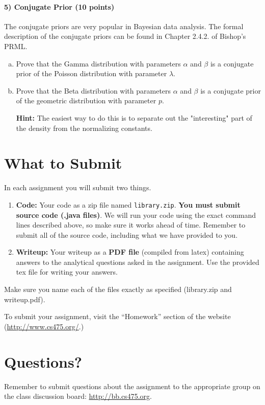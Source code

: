 \documentclass[11pt]{article}
\begin{document}
\paragraph{5) Conjugate Prior (10 points)}
The conjugate priors are very popular in Bayesian data analysis. The formal description of the conjugate priors can be found in Chapter 2.4.2. of Bishop's PRML.
\begin{enumerate}[(a)]
\item Prove that the Gamma distribution with parameters $\alpha$ and $\beta$ is a conjugate prior of the Poisson distribution with parameter $\lambda$.
\item Prove that the Beta distribution with parameters $\alpha$ and $\beta$ is a conjugate prior of the geometric distribution with parameter $p$.

{\bf Hint:} The easiest way to do this is to separate out the "interesting" part of the density from the normalizing constants.
\end{enumerate}


\section{What to Submit}
In each assignment you will submit two things.
\begin{enumerate}
\item {\bf Code:} Your code as a zip file named {\tt library.zip}. {\bf You must submit source code (.java files)}. We will run your code using the exact command lines described above, so make sure it works ahead of time. Remember to submit all of the source code, including what we have provided to you.
\item {\bf Writeup:} Your writeup as a {\bf PDF file} (compiled from latex) containing answers to the analytical questions asked in the assignment. Use the provided tex file for writing your answers.
\end{enumerate}
Make sure you name each of the files exactly as specified (library.zip and writeup.pdf).

To submit your assignment, visit the ``Homework'' section of the website (\href{http://www.cs475.org/}{http://www.cs475.org/}.)

\section{Questions?}
Remember to submit questions about the assignment to the appropriate group on the class discussion board: \href{http://bb.cs475.org/}{http://bb.cs475.org}.
\end{document}
